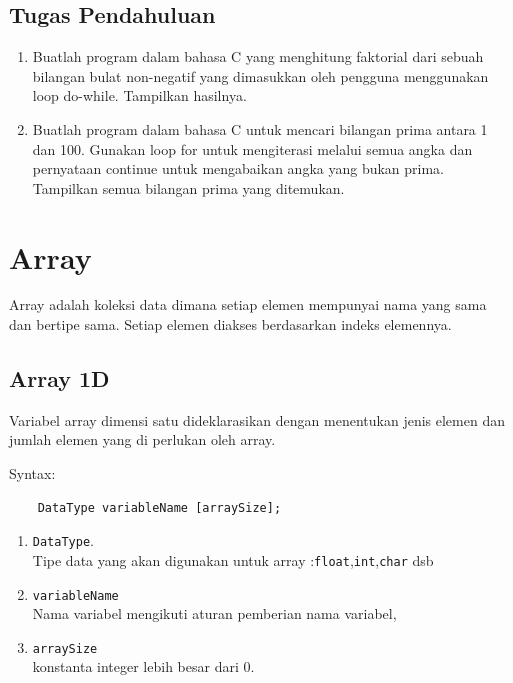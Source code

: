 \subsection{Tugas Pendahuluan}
\begin{enumerate}
	\item Buatlah program dalam bahasa C yang menghitung faktorial dari sebuah bilangan bulat non-negatif yang dimasukkan oleh pengguna menggunakan loop do-while. Tampilkan hasilnya.
	\item Buatlah program dalam bahasa C untuk mencari bilangan prima antara 1 dan 100. Gunakan loop for untuk mengiterasi melalui semua angka dan pernyataan continue untuk mengabaikan angka yang bukan prima. Tampilkan semua bilangan prima yang ditemukan.
\end{enumerate}

\section{Array}
Array adalah koleksi data dimana setiap elemen mempunyai nama yang sama dan bertipe sama. Setiap elemen diakses berdasarkan  indeks elemennya.
\subsection{Array 1D}
Variabel array dimensi satu dideklarasikan dengan menentukan jenis elemen dan jumlah elemen yang di perlukan oleh array.

Syntax:
\begin{verbatim}
    DataType variableName [arraySize];
\end{verbatim}
\begin{enumerate}
	\item \verb*|DataType|.\\
	      Tipe data yang akan digunakan untuk array :\verb*|float|,\verb*|int|,\verb*|char| dsb
	\item \verb*|variableName|\\
	      Nama variabel mengikuti aturan pemberian nama variabel,
	\item \verb*|arraySize| \\
	      konstanta integer lebih besar dari 0. \\
\end{enumerate}

